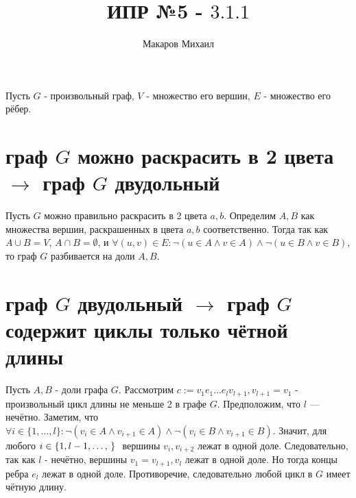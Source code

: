 \documentclass{article}
\title{ИПР №5 - $3.1.1$}
\author{Макаров Михаил}
\date{}
\newcommand{\range}[2]{
    \{#1, \ldots, #2 \}
}
\begin{document}
	\maketitle
    Пусть $G$ - произвольный граф, $V$ - множество его вершин, $E$ - множество его рёбер.
    \section{граф $G$ можно раскрасить в 2 цвета $\rightarrow$ граф $G$ двудольный}
    Пусть $G$ можно правильно раскрасить в 2 цвета $a, b$. Определим
    $A, B$ как множества вершин, раскрашенных в цвета $a, b$ соответственно. Тогда так
    как $A \cup B = V$, $A \cap B = \emptyset$, и 
    $ \forall (u, v) \in E: \neg (u \in A \land v \in A) \land \neg (u \in B \land v \in B) $, 
    то граф $G$ разбивается на доли $A, B$.
    \section{граф $G$ двудольный $\rightarrow$ граф $G$ содержит циклы только чётной длины}
    Пусть $A, B$ - доли графа $G$. Рассмотрим $c := v_1 e_1 \ldots e_l v_{l + 1}, v_{l + 1} = v_1$ - произвольный цикл     
    длины не меньше 2 в
    графе $G$. Предположим, что $l$ --- нечётно. Заметим, что 
    $ \forall i \in \range{1}{l}: \neg (v_i \in A \land v_{i + 1} \in A) \land \neg (v_i \in B \land v_{i + 1} \in B) $.
    Значит, для любого $i \in \range{1, l - 1}$ вершины $v_i, v_{i + 2}$ лежат в одной доле. Следовательно, так как
    $l$ - нечётно, вершины $v_1 = v_{l + 1}, v_l$ лежат в одной доле. Но тогда концы ребра $e_l$ лежат в одной доле.
    Противоречие, следовательно любой цикл в $G$ имеет чётную длину.
\end{document}
